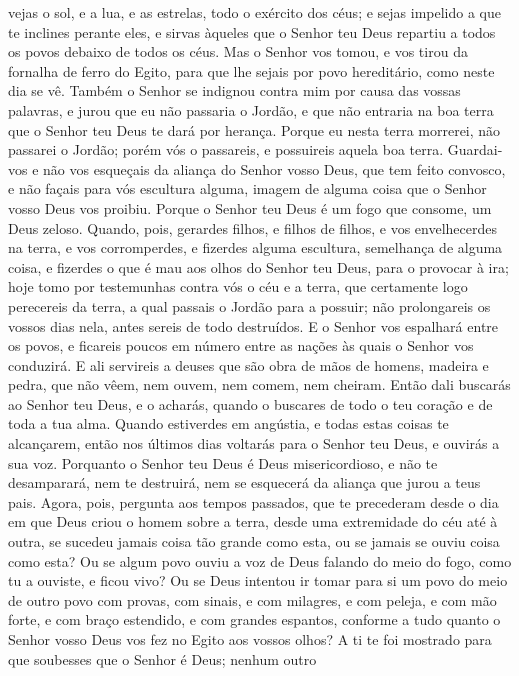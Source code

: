 vejas o sol, e a lua, e as estrelas, todo o exército dos céus; e
sejas impelido a que te inclines perante eles, e sirvas àqueles que
o Senhor teu Deus repartiu a todos os povos debaixo de todos os
céus. Mas o Senhor vos tomou, e vos tirou da fornalha de
ferro do Egito, para que lhe sejais por povo hereditário, como neste
dia se vê. Também o Senhor se indignou contra mim por causa
das vossas palavras, e jurou que eu não passaria o Jordão, e que não
entraria na boa terra que o Senhor teu Deus te dará por herança.
Porque eu nesta terra morrerei, não passarei o Jordão; porém
vós o passareis, e possuireis aquela boa terra. Guardai-vos e
não vos esqueçais da aliança do Senhor vosso Deus, que tem feito
convosco, e não façais para vós escultura alguma, imagem de alguma
coisa que o Senhor vosso Deus vos proibiu. Porque o Senhor
teu Deus é um fogo que consome, um Deus zeloso. Quando, pois,
gerardes filhos, e filhos de filhos, e vos envelhecerdes na terra, e
vos corromperdes, e fizerdes alguma escultura, semelhança de alguma
coisa, e fizerdes o que é mau aos olhos do Senhor teu Deus, para o
provocar à ira; hoje tomo por testemunhas contra vós o céu e
a terra, que certamente logo perecereis da terra, a qual passais o
Jordão para a possuir; não prolongareis os vossos dias nela, antes
sereis de todo destruídos. E o Senhor vos espalhará entre os
povos, e ficareis poucos em número entre as nações às quais o Senhor
vos conduzirá. E ali servireis a deuses que são obra de mãos
de homens, madeira e pedra, que não vêem, nem ouvem, nem comem, nem
cheiram. Então dali buscarás ao Senhor teu Deus, e o acharás,
quando o buscares de todo o teu coração e de toda a tua alma.
Quando estiverdes em angústia, e todas estas coisas te
alcançarem, então nos últimos dias voltarás para o Senhor teu Deus,
e ouvirás a sua voz. Porquanto o Senhor teu Deus é Deus
misericordioso, e não te desamparará, nem te destruirá, nem se
esquecerá da aliança que jurou a teus pais. Agora, pois,
pergunta aos tempos passados, que te precederam desde o dia em que
Deus criou o homem sobre a terra, desde uma extremidade do céu até à
outra, se sucedeu jamais coisa tão grande como esta, ou se jamais se
ouviu coisa como esta? Ou se algum povo ouviu a voz de Deus
falando do meio do fogo, como tu a ouviste, e ficou vivo? Ou
se Deus intentou ir tomar para si um povo do meio de outro povo com
provas, com sinais, e com milagres, e com peleja, e com mão forte, e
com braço estendido, e com grandes espantos, conforme a tudo quanto
o Senhor vosso Deus vos fez no Egito aos vossos olhos? A ti
te foi mostrado para que soubesses que o Senhor é Deus; nenhum outro

